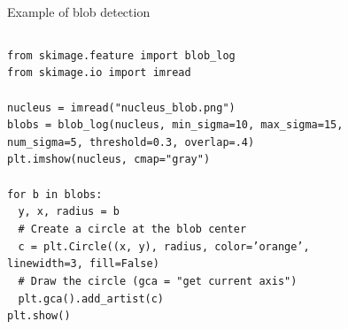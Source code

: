 \documentclass[9pt, aspectratio=169]{beamer}
\begin{document}
\begin{frame}
    {Example of blob detection}
    \begin{columns}
        \begin{column}{.7\textwidth}
            \begin{codebox}
                \texttt{from skimage.feature import blob\_log\\
                    from skimage.io import imread\\
                    \\
                    nucleus = imread("nucleus\_blob.png")\\
                    blobs = blob\_log(nucleus, min\_sigma=10, max\_sigma=15,
                    $~~~~~~~~~~~~~~~~~$num\_sigma=5, threshold=0.3, overlap=.4)\\
                    \pause
                    plt.imshow(nucleus, cmap="gray")\\
                    \\
                    for b in blobs:\\
                    $~~~~$y, x, radius = b\\
                    $~~~~$\# Create a circle at the blob center\\
                    $~~~~$c = plt.Circle((x, y), radius, color='orange',
                    $~~~~~~~~~~~~~~~~~~~$linewidth=3, fill=False)\\
                    $~~~~$\# Draw the circle (gca = "get current axis")\\
                    $~~~~$plt.gca().add\_artist(c)\\
                    plt.show()
                }
            \end{codebox}
        \end{column}
        \begin{column}{.3\textwidth}
\end{column}
\end{columns}
\end{frame}
\end{document}
